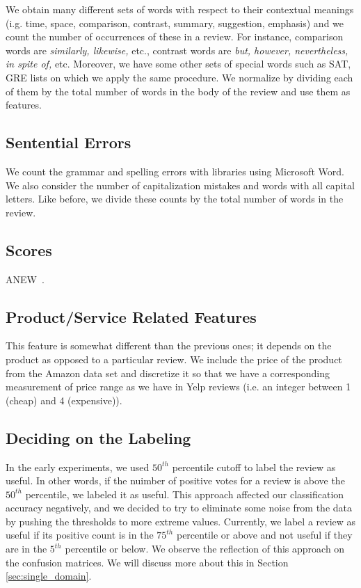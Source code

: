 \documentclass[letterpaper]{article}
\begin{document}
We obtain many different sets of words with respect to their
contextual meanings (i.g. time, space, comparison, contrast, summary,
suggestion, emphasis) and we count the number of occurrences of these
in a review. For instance, comparison words are \emph{similarly,
  likewise,} etc., contrast words are \emph{but, however,
  nevertheless, in spite of,} etc. Moreover, we have some other sets
of special words such as SAT, GRE lists on which we apply the same
procedure.  We normalize by dividing each of them by the total number
of words in the body of the review and use them as features.

\subsection{Sentential Errors}
We count the grammar and spelling errors with libraries using
Microsoft Word. We also consider the number of capitalization
mistakes and words with all capital letters. Like before, we divide
these counts by the total number of words in the review.

\subsection{Scores}
ANEW~\cite{DoddsANEWPaper}.

\subsection{Product/Service Related Features} 
This feature is somewhat different than the previous ones; it depends
on the product as opposed to a particular review. We include the price
of the product from the Amazon data set and discretize it so that we
have a corresponding measurement of price range as we have in Yelp
reviews (i.e. an integer between 1 (cheap) and 4 (expensive)).

\subsection{Deciding on the Labeling}
In the early experiments, we used $50^{th}$ percentile cutoff to label
the review as useful. In other words, if the nuimber of positive votes
for a review is above the $50^{th}$ percentile, we labeled it as
useful. This approach affected our classification accuracy negatively,
and we decided to try to eliminate some noise from the data by pushing
the thresholds to more extreme values. Currently, we label a review as
useful if its positive count is in the $75^{th}$ percentile or above
and not useful if they are in the $5^{th}$ percentile or below. We
observe the reflection of this approach on the confusion matrices. We
will discuss more about this in Section \ref{sec:single_domain}.
\end{document}
